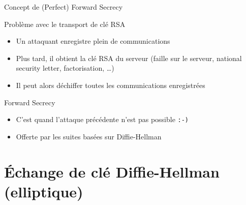 \documentclass{mpg-ep-slides}
\begin{document}
\begin{frame}{Concept de (Perfect) Forward Secrecy}
  \begin{block}{Problème avec le transport de clé RSA}
    \begin{itemize}
      \item Un attaquant enregistre plein de communications
      \item Plus tard, il obtient la clé RSA du serveur (faille sur le
        serveur, national security letter, factorisation, \dots)
      \item Il peut alors déchiffer toutes les communications enregistrées
    \end{itemize}
  \end{block}

  \begin{block}{Forward Secrecy}
    \begin{itemize}
      \item C'est quand l'attaque précédente n'est pas possible
        \texttt{\string:-)}
      \item Offerte par les suites basées sur Diffie-Hellman
    \end{itemize}
  \end{block}
\end{frame}

\section[(EC)DHE]{Échange de clé Diffie-Hellman (elliptique)}
\tocsect
\end{document}
